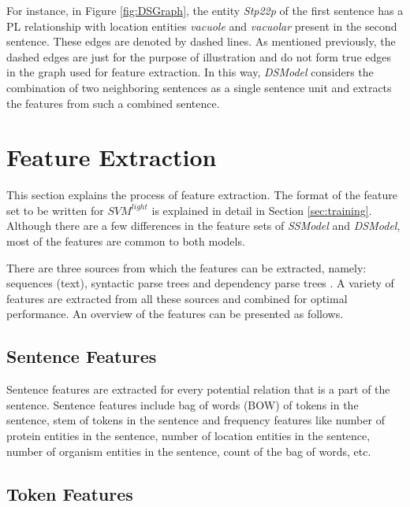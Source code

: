 For instance, in Figure \ref{fig:DSGraph}, the entity \textit{Stp22p} of the first sentence has a PL relationship with location entities \textit{vacuole} and \textit{vacuolar} present in the second sentence. These edges are denoted by dashed lines. As mentioned previously, the dashed edges are just for the purpose of illustration and do not form true edges in the graph used for feature extraction. In this way, \textit{DSModel} considers the combination of two neighboring sentences as a single sentence unit and extracts the features from such a combined sentence.


\section{Feature Extraction}\label{sec:featExp}

This section explains the process of feature extraction. The format of the feature set to be written for $SVM^{light}$ is explained in detail in Section \ref{sec:training}. Although there are a few differences in the feature sets of \textit{SSModel} and \textit{DSModel}, most of the features are common to both models.

There are three sources from which the features can be extracted, namely: sequences (text), syntactic parse trees and dependency parse trees \cite{jiang2007systematic}. A variety of features are extracted from all these sources and combined for optimal performance. An overview of the features can be presented as follows.

\subsection*{Sentence Features}

Sentence features are extracted for every potential relation that is a part of the sentence. Sentence features include bag of words (BOW) of tokens in the sentence, stem of tokens in the sentence and frequency features like number of protein entities in the sentence, number of location entities in the sentence, number of organism entities in the sentence, count of the bag of words, etc.

\subsection*{Token Features}

